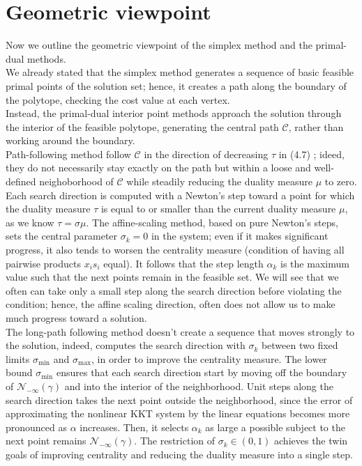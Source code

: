 \documentclass[a4paper,10 pt,titlepage,twoside]{book}
\theoremstyle{plain}
\theoremstyle{definition}
\theoremstyle{remark}
\begin{document}
\section*{Geometric viewpoint}
Now we outline the geometric viewpoint of the simplex method and the primal-dual methods.\\
We already stated that the simplex method generates a sequence of basic feasible primal points of the solution set; hence, it creates a path along the boundary of the polytope, checking the cost value at each vertex.\\Instead, the primal-dual interior point methods approach the solution through the interior of the feasible polytope, generating the central path $\mathcal{C}$, rather than working around the boundary.\\ Path-following method follow $\mathcal{C}$ in the direction of decreasing $\tau$ in (4.7) ; ideed, they do not necessarily stay exactly on the path but within a loose and well-defined neighoborhood of $\mathcal{C}$ while steadily reducing the duality measure $\mu$ to zero. Each search direction is computed with a Newton's step toward a point for which the duality measure $\tau$ is equal to or smaller than the current duality measure $\mu$, as we know $\tau=\sigma\mu$. 
The affine-scaling method, based on pure Newton's steps, sets the central parameter $\sigma_{k}= 0$ in the system;
even if it makes significant progress, it also tends to worsen the centrality measure (condition of having all pairwise products $x_{i}s_{i}$ equal). It follows that the step length $\alpha_{k}$ is the maximum value such that the next points remain in the feasible set. We will see that we often can take only a small
step along the search direction before violating the condition; hence, the affine scaling direction, often does not allow us to make much progress toward a solution.\\ 
The long-path following method doesn't create a sequence that moves strongly to the solution, indeed, computes the search direction with $\sigma_{k}$ between two fixed limits $\sigma_{\text{min}}$ and $\sigma_{\text{max}}$, in order to improve the centrality measure. The lower bound $\sigma_{\text{min}}$ ensures that each search direction start by moving off the boundary of $\mathcal{N}_{-\infty}(\gamma)$ and into the interior of the neighborhood. Unit steps along the search direction takes the next point outside the neighborhood, since the error of approximating the nonlinear KKT system by the linear equations becomes more pronounced as $\alpha$ increases. Then, it selects $\alpha_{k}$ as large a possible subject to the next point remains $\mathcal{N}_{-\infty}(\gamma)$. The restriction of $\sigma_{k}\in(0,1)$ achieves the twin goals of improving centrality and reducing the duality measure into a single step.\\
\end{document}
